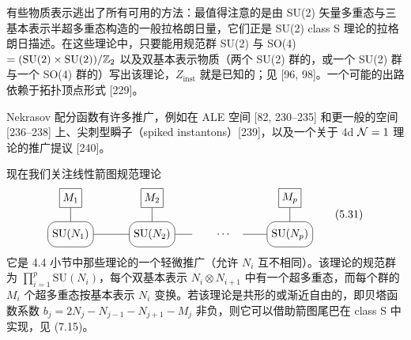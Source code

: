 有些物质表示逃出了所有可用的方法：最值得注意的是由 SU(2) 矢量多重态与三基本表示半超多重态构造的一般拉格朗日量，它们正是 SU(2) class S 理论的拉格朗日描述。在这些理论中，只要能用规范群 SU(2) 与 SO(4) $=(\mathrm{SU}(2)\times\mathrm{SU}(2))/\mathbb{Z}_2$ 以及双基本表示物质（两个 SU(2) 群的，或一个 SU(2) 群与一个 SO(4) 群的）写出该理论，$Z_{\mathrm{inst}}$ 就是已知的；见 [96, 98]。一个可能的出路依赖于拓扑顶点形式 [229]。

Nekrasov 配分函数有许多推广，例如在 ALE 空间 [82, 230--235] 和更一般的空间 [236--238] 上、尖刺型瞬子（spiked instantons）[239]，以及一个关于 4d $\mathcal{N}=1$ 理论的推广提议 [240]。

 现在我们关注线性箭图规范理论
\begin{equation}
  \begin{tikzpicture}[baseline=(current bounding box.center)]
    \node[draw, rounded corners=8pt, inner sep=4pt, minimum height=8mm] (n1) at (0,0) {$\mathrm{SU}(N_1)$};
    \node[draw, rounded corners=8pt, inner sep=4pt, minimum height=8mm] (n2) at (2.6,0) {$\mathrm{SU}(N_2)$};
    \node[draw, rounded corners=8pt, inner sep=4pt, minimum height=8mm] (np) at (7.0,0) {$\mathrm{SU}(N_p)$};
    \node[draw, inner sep=3pt, minimum height=6mm] (m1) at (0,1.15) {$M_1$};
    \node[draw, inner sep=3pt, minimum height=6mm] (m2) at (2.6,1.15) {$M_2$};
    \node[draw, inner sep=3pt, minimum height=6mm] (mp) at (7.0,1.15) {$M_p$};
    \draw (m1.south) -- (n1.north);
    \draw (m2.south) -- (n2.north);
    \draw (mp.south) -- (np.north);
    \draw (n1.east) -- (n2.west);
    \draw (n2.east) -- ++(0.55,0);
    \node at (4.9,0) {$\cdots$};
    \draw (5.5,0) -- (np.west);
  \end{tikzpicture}
  \tag{5.31}
\end{equation}
它是 4.4 小节中那些理论的一个轻微推广（允许 $N_i$ 互不相同）。该理论的规范群为 $\prod_{i=1}^{p}\mathrm{SU}(N_i)$，每个双基本表示 $N_i\otimes N_{i+1}$ 中有一个超多重态，而每个群的 $M_i$ 个超多重态按基本表示 $N_i$ 变换。若该理论是共形的或渐近自由的，即贝塔函数系数 $b_j=2N_j-N_{j-1}-N_{j+1}-M_j$ 非负，则它可以借助箭图尾巴在 class S 中实现，见 (7.15)。


